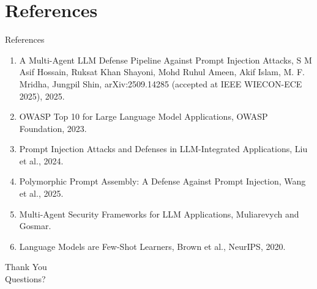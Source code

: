 \documentclass[10pt]{beamer}
\begin{document}
\section{References}
\begin{frame}[allowframebreaks]{References}
  \footnotesize
  \begin{enumerate}
    \item A Multi-Agent LLM Defense Pipeline Against Prompt Injection Attacks, S M Asif Hossain, Ruksat Khan Shayoni, Mohd Ruhul Ameen, Akif Islam, M. F. Mridha, Jungpil Shin, arXiv:2509.14285 (accepted at IEEE WIECON-ECE 2025), 2025.
    \item OWASP Top 10 for Large Language Model Applications, OWASP Foundation, 2023.
    \item Prompt Injection Attacks and Defenses in LLM-Integrated Applications, Liu et al., 2024.
    \item Polymorphic Prompt Assembly: A Defense Against Prompt Injection, Wang et al., 2025.
    \item Multi-Agent Security Frameworks for LLM Applications, Muliarevych and Gosmar.
    \item Language Models are Few-Shot Learners, Brown et al., NeurIPS, 2020.
  \end{enumerate}
\end{frame}

\begin{frame}[plain]
  \begin{center}
    {\Huge Thank You}\\[1em]
    {\large Questions?}
  \end{center}
\end{frame}
\end{document}
